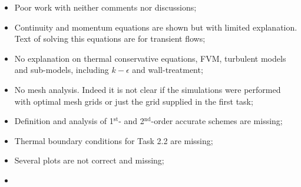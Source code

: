 \documentclass[14pt,twoside]{report}
\begin{document}
\clearpage 





\bigskip


\medskip

  \begin{itemize}
%
     \item Poor work with neither comments nor discussions;
     \item Continuity and momentum equations are shown but with limited explanation. Text of solving this equations are for transient flows;
     \item No explanation on thermal conservative equations, FVM, turbulent models and sub-models, including $k-\epsilon$ and wall-treatment;%
     \item No mesh analysis. Indeed it is not clear if the simulations were performed with optimal mesh grids or just the grid supplied in the first task;
     \item Definition and analysis of 1$^{\text{st}}$- and 2$^{\text{nd}}$-order accurate schemes are missing;
     \item Thermal boundary conditions for Task 2.2 are missing;
     \item Several plots are not correct and missing;
%
  \end{itemize}

\clearpage 




\bigskip


\medskip

  \begin{itemize}
%
     \item 
%
  \end{itemize}

\clearpage 





\bigskip
\end{document}
